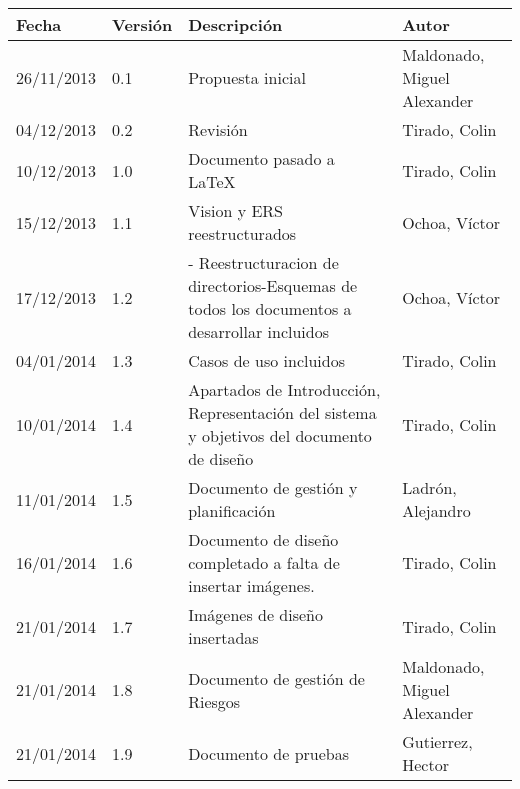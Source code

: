 \begin{tabular}{|p{3cm}|p{1.5cm}|p{3.5cm}|p{4cm}|}
    \hline
    \textbf{Fecha} & \textbf{Versión} & \textbf{Descripción} & \textbf{Autor} \\
    \hline
    26/11/2013 & 0.1 & Propuesta inicial & Maldonado, Miguel Alexander \\
    \hline
    04/12/2013 & 0.2 & Revisión & Tirado, Colin \\
    \hline
    10/12/2013 & 1.0 & Documento pasado a LaTeX & Tirado, Colin \\
    \hline
    15/12/2013 & 1.1 & Vision y ERS reestructurados & Ochoa, Víctor \\
    \hline
    17/12/2013 & 1.2 & - Reestructuracion de directorios\newline -Esquemas de todos los documentos a desarrollar incluidos & Ochoa, Víctor \\
    \hline
    04/01/2014 & 1.3 & Casos de uso incluidos & Tirado, Colin \\
    \hline
    10/01/2014 & 1.4 & Apartados de Introducci\'on, Representaci\'on del sistema y objetivos del documento de dise\~no & Tirado, Colin \\
    \hline
    11/01/2014 & 1.5 & Documento de gestión y planificación & Ladrón, Alejandro \\
    \hline
    16/01/2014 & 1.6 & Documento de dise\~no completado a falta de insertar im\'agenes. & Tirado, Colin \\
    \hline
    21/01/2014 & 1.7 & Imágenes de diseño insertadas & Tirado, Colin \\
    \hline
    21/01/2014 & 1.8 & Documento de gestión de Riesgos & Maldonado, Miguel Alexander\\
    \hline
    21/01/2014 & 1.9 & Documento de pruebas & Gutierrez, Hector \\
    \hline
\end{tabular}

